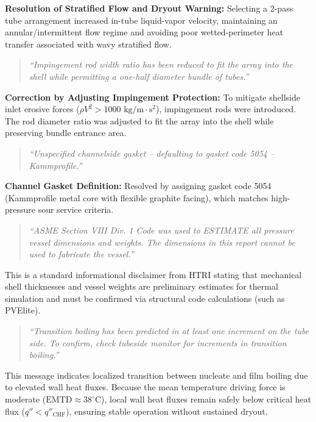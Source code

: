 \documentclass[12pt]{article}
\begin{document}
\textbf{Resolution of Stratified Flow and Dryout Warning:} Selecting a 2-pass tube arrangement increased in-tube liquid-vapor velocity, maintaining an annular/intermittent flow regime and avoiding poor wetted-perimeter heat transfer associated with wavy stratified flow.

\begin{quote}
\textit{``Impingement rod width ratio has been reduced to fit the array into the shell while permitting a one-half diameter bundle of tubes.''}
\end{quote}

\textbf{Correction by Adjusting Impingement Protection:} To mitigate shellside inlet erosive forces ($\rho V^2 > 1000\text{ kg/m}\cdot\text{s}^2$), impingement rods were introduced. The rod diameter ratio was adjusted to fit the array into the shell while preserving bundle entrance area.

\begin{quote}
\textit{``Unspecified channelside gasket -- defaulting to gasket code 5054 -- Kammprofile.''}
\end{quote}

\textbf{Channel Gasket Definition:} Resolved by assigning gasket code 5054 (Kammprofile metal core with flexible graphite facing), which matches high-pressure sour service criteria.

\begin{quote}
\textit{``ASME Section VIII Div. 1 Code was used to ESTIMATE all pressure vessel dimensions and weights. The dimensions in this report cannot be used to fabricate the vessel.''}
\end{quote}

This is a standard informational disclaimer from HTRI stating that mechanical shell thicknesses and vessel weights are preliminary estimates for thermal simulation and must be confirmed via structural code calculations (such as PVElite).

\begin{quote}
\textit{``Transition boiling has been predicted in at least one increment on the tube side. To confirm, check tubeside monitor for increments in transition boiling.''}
\end{quote}

This message indicates localized transition between nucleate and film boiling due to elevated wall heat fluxes. Because the mean temperature driving force is moderate ($\text{EMTD} \approx 38^\circ\text{C}$), local wall heat fluxes remain safely below critical heat flux ($q'' < q''_{\text{CHF}}$), ensuring stable operation without sustained dryout.
\end{document}
